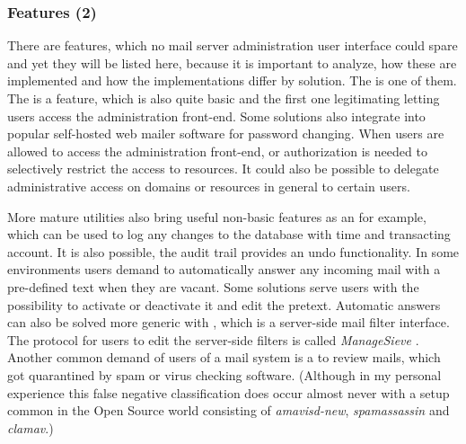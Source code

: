 \documentclass[12pt,a4paper]{scrartcl}
\begin{document}
			\subsubsection{Features (2)}
				There are features, which no mail server administration user
				interface could spare and yet they will be listed here, because
				it is important to analyze, how these are implemented and how
				the implementations differ by solution. The  is one of them. The
				 is a feature,
				which is also quite basic and the first one legitimating
				letting users access the administration front-end. Some
				solutions also integrate into popular self-hosted web mailer
				software for password changing. When users are allowed to
				access the administration front-end, 
				or authorization is needed to selectively restrict the access
				to resources. It could also be possible to delegate
				administrative access on domains or resources in general to
				certain users.

				More mature utilities also bring useful non-basic features as
				an  for example, which can be used to
				log any changes to the database with time and transacting
				account. It is also possible, the audit trail provides an undo
				functionality. In some environments users demand  to automatically answer any incoming mail with
				a pre-defined text when they are vacant. Some solutions serve
				users with the possibility to activate or deactivate it and
				edit the pretext. Automatic answers can also be solved more
				generic with  \cite{sieve}, which is a
				server-side mail filter interface. The protocol for users to
				edit the server-side filters is called \emph{ManageSieve}
				\cite{managesieve}. Another common demand of users of a mail
				system is a  to review mails, which
				got quarantined by spam or virus checking software. (Although
				in my personal experience this false negative classification
				does occur almost never with a setup common in the Open Source
				world consisting of \emph{amavisd-new}, \emph{spamassassin} and
				\emph{clamav}.)
\end{document}
